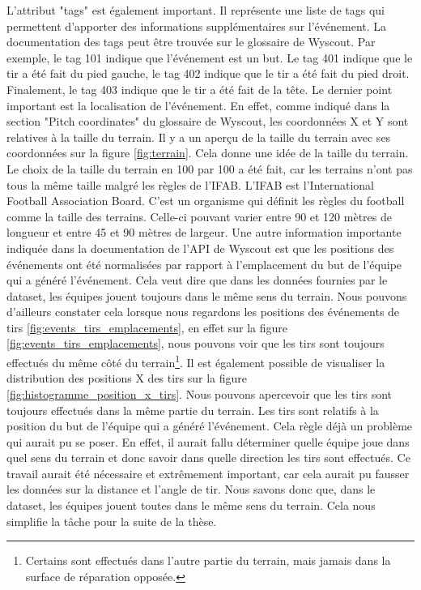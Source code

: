 \documentclass[12pt]{article}
\begin{document}
L'attribut "tags" est également important.
Il représente une liste de tags qui permettent d'apporter des informations supplémentaires sur l'événement.
La documentation des tags peut être trouvée sur le glossaire de Wyscout. \cite{WyscoutGlossary}
Par exemple, le tag 101 indique que l'événement est un but.
Le tag 401 indique que le tir a été fait du pied gauche, le tag 402 indique que le tir a été fait du pied droit.
Finalement, le tag 403 indique que le tir a été fait de la tête.
\newline\newline
Le dernier point important est la localisation de l'événement.
En effet, comme indiqué dans la section "Pitch coordinates" du glossaire de Wyscout, \cite{WyscoutGlossary} les coordonnées X et Y sont relatives à la taille du terrain.
Il y a un aperçu de la taille du terrain avec ses coordonnées sur la figure \ref{fig:terrain}.
Cela donne une idée de la taille du terrain.
Le choix de la taille du terrain en 100 par 100 a été fait, car les terrains n'ont pas tous la même taille malgré les règles de l'IFAB.
\newline\newline
L'IFAB est l'International Football Association Board.
C'est un organisme qui définit les règles du football comme la taille des terrains.
Celle-ci pouvant varier entre 90 et 120 mètres de longueur et entre 45 et 90 mètres de largeur. \cite{TerrainIFAB}
\newline\newline
Une autre information importante indiquée dans la documentation de l'API de Wyscout \cite{WyscoutAPI} est que les positions des événements ont été normalisées par rapport à l'emplacement du but de l'équipe qui a généré l'événement.
Cela veut dire que dans les données fournies par le dataset, les équipes jouent toujours dans le même sens du terrain.
Nous pouvons d'ailleurs constater cela lorsque nous regardons les positions des événements de tirs \ref{fig:events_tirs_emplacements}, en effet sur la figure \ref{fig:events_tirs_emplacements}, nous pouvons voir que les tirs sont toujours effectués du même côté du terrain\footnote{Certains sont effectués dans l'autre partie du terrain, mais jamais dans la surface de réparation opposée.}.
Il est également possible de visualiser la distribution des positions X des tirs sur la figure \ref{fig:histogramme_position_x_tirs}.
Nous pouvons apercevoir que les tirs sont toujours effectués dans la même partie du terrain.
Les tirs sont relatifs à la position du but de l'équipe qui a généré l'événement.
Cela règle déjà un problème qui aurait pu se poser.
En effet, il aurait fallu déterminer quelle équipe joue dans quel sens du terrain et donc savoir dans quelle direction les tirs sont effectués.
Ce travail aurait été nécessaire et extrêmement important, car cela aurait pu fausser les données sur la distance et l'angle de tir.
\newline\newline
Nous savons donc que, dans le dataset, les équipes jouent toutes dans le même sens du terrain. Cela nous simplifie la tâche pour la suite de la thèse.
\end{document}
